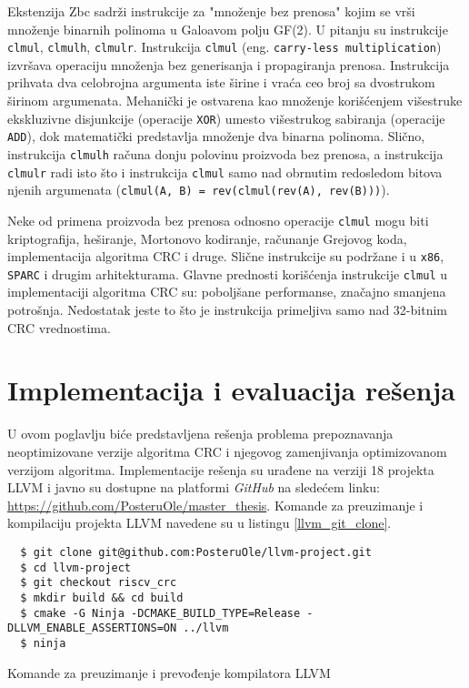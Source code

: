 \documentclass[12pt,oneside]{memoir}
\begin{document}
Ekstenzija Zbc sadrži instrukcije za "množenje bez prenosa" kojim se vrši množenje binarnih polinoma u Galoavom polju GF(2). U pitanju su instrukcije \texttt{clmul}, \texttt{clmulh}, \texttt{clmulr}. %
Instrukcija \texttt{clmul} (eng. \texttt{carry-less multiplication}) izvršava operaciju množenja bez generisanja i propagiranja prenosa. Instrukcija prihvata dva celobrojna argumenta iste širine i vraća ceo broj sa dvostrukom širinom argumenata. Mehanički je ostvarena kao množenje korišćenjem višestruke ekskluzivne disjunkcije (operacije \texttt{XOR}) umesto višestrukog sabiranja (operacije \texttt{ADD}), dok matematički predstavlja množenje dva binarna polinoma. 
Slično, instrukcija \texttt{clmulh} računa donju polovinu proizvoda bez prenosa, a
instrukcija \texttt{clmulr} radi isto što i instrukcija \texttt{clmul} samo nad obrnutim redosledom bitova njenih argumenata (\texttt{clmul(A, B) = rev(clmul(rev(A), rev(B)))}).

Neke od primena proizvoda bez prenosa odnosno operacije \texttt{clmul} mogu biti kriptografija, heširanje, Mortonovo kodiranje, računanje Grejovog koda, implementacija algoritma CRC i druge. Slične instrukcije su podržane i u \texttt{x86}, \texttt{SPARC} i drugim arhitekturama. Glavne prednosti korišćenja instrukcije \texttt{clmul} u implementaciji algoritma CRC su: poboljšane performanse, značajno smanjena potrošnja. Nedostatak jeste to što je instrukcija primeljiva samo nad 32-bitnim CRC vrednostima.

\chapter{Implementacija i evaluacija rešenja}
\label{chap:implementacija}
U ovom poglavlju biće predstavljena rešenja problema prepoznavanja 
neoptimizovane verzije algoritma CRC i njegovog zamenjivanja optimizovanom verzijom algoritma. Implementacije rešenja su urađene na verziji 18 projekta LLVM i javno su dostupne na platformi \textit{GitHub} na sledećem linku: \url{https://github.com/PosteruOle/master_thesis}. Komande za preuzimanje i kompilaciju projekta LLVM navedene su u listingu \ref{llvm_git_clone}.

\begin{listing}[!ht]
\begin{verbatim}
  $ git clone git@github.com:PosteruOle/llvm-project.git
  $ cd llvm-project
  $ git checkout riscv_crc
  $ mkdir build && cd build
  $ cmake -G Ninja -DCMAKE_BUILD_TYPE=Release -DLLVM_ENABLE_ASSERTIONS=ON ../llvm
  $ ninja
\end{verbatim}
\caption{Komande za preuzimanje i prevođenje kompilatora LLVM}
\label{llvm_git_clone}
\end{listing}
\end{document}
